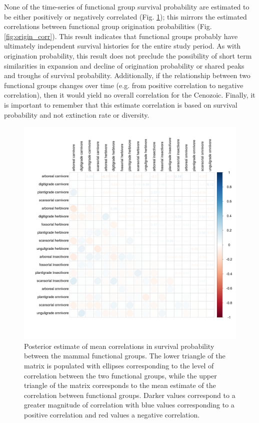 \documentclass[12pt,letterpaper]{article}
\begin{document}
None of the time-series of functional group survival probability are estimated to be either positively or negatively correlated (Fig. \ref{fig:survival_corr}); this mirrors the estimated correlations between functional group origination probabilities (Fig. \ref{fig:origin_corr}). This result indicates that functional groups probably have ultimately independent survival histories for the entire study period. As with origination probability, this result does not preclude the possibility of short term similarities in expansion and decline of origination probability or shared peaks and troughs of survival probability. Additionally, if the relationship between two functional groups changes over time (e.g. from positive correlation to negative correlation), then it would yield no overall correlation for the Cenozoic. Finally, it is important to remember that this estimate correlation is based on survival probability and not extinction rate or diversity.
\begin{figure}[ht]
  \centering
  \includegraphics[width=\textwidth,height=\textheight,keepaspectratio=true]{figure/survival_correlation}
  \caption{Posterior estimate of mean correlations in survival probability between the mammal functional groups. The lower triangle of the matrix is populated with ellipses corresponding to the level of correlation between the two functional groups, while the upper triangle of the matrix corresponds to the mean estimate of the correlation between functional groups. Darker values correspond to a greater magnitude of correlation with blue values corresponding to a positive correlation and red values a negative correlation.}
  \label{fig:survival_corr}
\end{figure}
\end{document}
